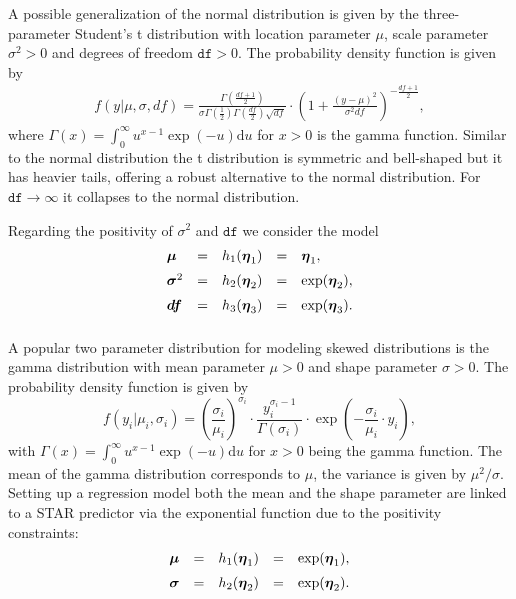 \documentclass[11pt,a4paper,twoside]{bayesxarticle}
\begin{document}
A possible generalization of the normal distribution is given by the three-parameter Student's t distribution with location parameter $\mu$, scale parameter $\sigma^2>0$ and degrees of freedom $\texttt{df}>0$. The probability density function is given by
\begin{align*}
f(y|\mu, \sigma, df) = \frac{\Gamma\left( \frac{df +1 }{2}\right)}{\sigma \Gamma\left( \frac{1}{2}\right) \Gamma\left(
\frac{df}{2}\right)\sqrt{df}} \cdot \left( 1+ \frac{(y-\mu)^2}{\sigma^2 df}\right)^{-\frac{df+1}{2}},
\end{align*}
where $\Gamma(x) = \int_0^{\infty} u^{x-1} \exp(-u) \mathrm{d}u$ for $x>0$ is the gamma function. Similar to the normal distribution the t distribution is symmetric and bell-shaped but it has heavier tails, offering a robust alternative to the normal distribution. For $\texttt{df} \rightarrow \infty$ it collapses to the normal distribution.

Regarding the positivity of $\sigma^2$ and $\texttt{df}$ we consider the model
\begin{align*}
\begin{array}{lllll}
\muvec & = & h_1(\etavec_1) & = & \etavec_1, \\ [0.2cm]
\sigmavec^2 & = & h_2(\etavec_2) & = & \exp(\etavec_2), \\ [0.2cm]
\boldsymbol{\texttt{df}} & = & h_3(\etavec_3) & = & \exp(\etavec_3). \\ [0.2cm]
\end{array}
\end{align*}

A popular two parameter distribution for modeling skewed distributions is the gamma distribution with mean parameter $\mu>0$ and shape parameter $\sigma>0$. The probability density function is given by
\begin{equation*}
f(y_i|\mu_i, \sigma_i) = \left( \frac{\sigma_i}{\mu_i} \right)^{\sigma_i} \cdot \frac{y_i^{\sigma_i-1}}{\Gamma(\sigma_i)} \cdot \exp\left(- \frac{\sigma_i}{\mu_i} \cdot y_i \right),
\end{equation*}
with $\Gamma(x) = \int_0^{\infty} u^{x-1} \exp(-u) \mathrm{d}u$ for $x>0$ being the gamma function. The mean of the gamma distribution corresponds to $\mu$, the variance is given by $\mu^2/\sigma$.
Setting up a regression model both the mean and the shape parameter are linked to a STAR predictor via the exponential function due to the positivity constraints:
\begin{align*}
\begin{array}{lllll}
\boldsymbol{\mu} & = & h_1(\boldsymbol{\eta}_1) & = & \exp(\boldsymbol{\eta}_1), \\ [0.2cm]
\mbox{\boldmath $\sigma$} & = & h_2(\boldsymbol{\eta}_2) & = & \exp(\boldsymbol{\eta}_2).
\end{array}
\end{align*}
\end{document}
